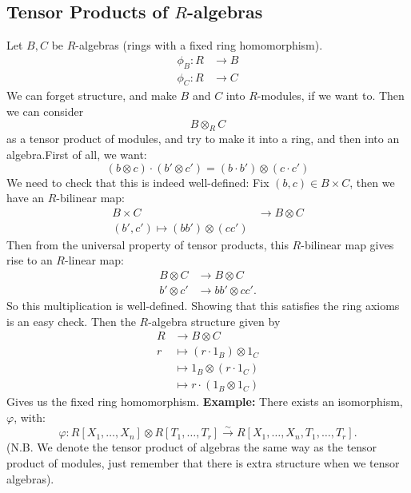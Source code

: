 \documentclass{article}
\begin{document}
    \subsection{Tensor Products of $R$-algebras}
    Let $B,C$ be $R$-algebras (rings with a fixed ring homomorphism). \begin{align*}
        \phi_{B} : R &\to B\\
        \phi_{C} : R &\to C
    \end{align*}
We can forget structure, and make $B$ and $C$ into $R$-modules, if we want to. Then we can consider \[ B \otimes_{R} C \] as a tensor product of modules, and try to make it into a ring, and then into an algebra.\gap First of all, we want: \[ (b \otimes c) \cdot (b' \otimes c') = (b \cdot b') \otimes (c \cdot c')\]
We need to check that this is indeed well-defined:\gap 
Fix $(b,c) \in B \times C$, then we have an $R$-bilinear map: \begin{align*}
    B \times C &\to B \otimes C\\
    (b',c') \mapsto (bb')\otimes(cc')
\end{align*}
Then from the universal property of tensor products, this $R$-bilinear map gives rise to an $R$-linear map: \begin{align*}
    B \otimes C &\to B \otimes C\\
    b' \otimes c' &\to bb' \otimes cc'.
\end{align*}
So this multiplication is well-defined. \endproof
Showing that this satisfies the ring axioms is an easy check. Then the $R$-algebra structure given by \begin{align*}
    R &\to B \otimes C\\
    r &\mapsto (r \cdot 1_{B}) \otimes 1_{C}\\
    &\mapsto 1_{B} \otimes (r \cdot 1_{C})\\
    &\mapsto r \cdot (1_{B} \otimes 1_{C})
\end{align*}
Gives us the fixed ring homomorphism. \gap \textbf{Example: }
There exists an isomorphism, $\varphi$, with: \[ \varphi : R[X_{1}, \dots, X_{n}] \otimes R[T_{1}, \dots, T_{r}] \xrightarrow \sim R[X_{1},\dots, X_{n}, T_{1}, \dots, T_{r}]. \]
(N.B. We denote the tensor product of algebras the same way as the tensor product of modules, just remember that there is extra structure when we tensor algebras).
\end{document}

